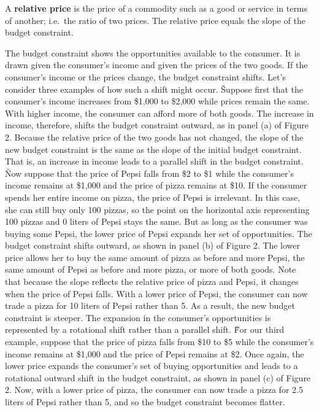 A \textbf{relative price} is the price of a commodity such as a good or service in terms of another; i.e.\ the ratio
of two prices. The relative price equals the slope of the budget constraint.
\ed

The budget constraint shows the opportunities available to the consumer. It is drawn given the consumer's income and
given the prices of the two goods. If the consumer's income or the prices change, the budget constraint shifts. Let's
consider three examples of how such a shift might occur. \v

Suppose first that the consumer's income increases from \$1,000 to \$2,000 while prices remain the same. With higher
income, the consumer can afford more of both goods. The increase in income, therefore, shifts the budget constraint
outward, as in panel (a) of Figure 2. Because the relative price of the two goods has not changed, the slope of the
new budget constraint is the same as the slope of the initial budget constraint. That is, an increase in income leads
to a parallel shift in the budget constraint. \v

Now suppose that the price of Pepsi falls from \$2 to \$1 while the consumer's income remains at \$1,000 and the
price of pizza remains at \$10. If the consumer spends her entire income on pizza, the price of Pepsi is irrelevant.
In this case, she can still buy only 100 pizzas, so the point on the horizontal axis representing 100 pizzas and 0
liters of Pepsi stays the same. But as long as the consumer was buying some Pepsi, the lower price of Pepsi expands
her set of opportunities. The budget constraint shifts outward, as shown in panel (b) of Figure 2. The lower price
allows her to buy the same amount of pizza as before and more Pepsi, the same amount of Pepsi as before and more
pizza, or more of both goods. Note that because the slope reflects the relative price of pizza and Pepsi, it changes
when the price of Pepsi falls. With a lower price of Pepsi, the consumer can now trade a pizza for 10 liters of Pepsi
rather than 5. As a result, the new budget constraint is steeper. The expansion in the consumer's opportunities is
represented by a rotational shift rather than a parallel shift. \v

For our third example, suppose that the price of pizza falls from \$10 to \$5 while the consumer's income remains at
\$1,000 and the price of Pepsi remains at \$2. Once again, the lower price expands the consumer's set of buying
opportunities and leads to a rotational outward shift in the budget constraint, as shown in panel (c) of Figure 2.
Now, with a lower price of pizza, the consumer can now trade a pizza for 2.5 liters of Pepsi rather than 5, and so
the budget constraint becomes flatter.

